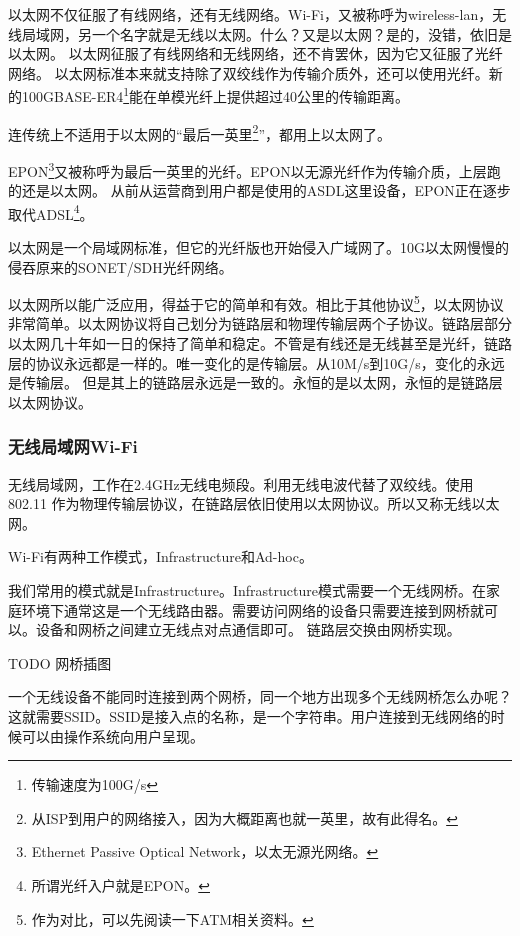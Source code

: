 以太网不仅征服了有线网络，还有无线网络。Wi-Fi，又被称呼为wireless-lan，无线局域网，另一个名字就是无线以太网。什么？又是以太网？是的，没错，依旧是以太网。
以太网征服了有线网络和无线网络，还不肯罢休，因为它又征服了光纤网络。
以太网标准本来就支持除了双绞线作为传输介质外，还可以使用光纤。新的100GBASE-ER4\footnote{传输速度为100G/s}能在单模光纤上提供超过40公里的传输距离。

连传统上不适用于以太网的“最后一英里\footnote{从ISP到用户的网络接入，因为大概距离也就一英里，故有此得名。}”，都用上以太网了。

EPON\footnote{Ethernet Passive Optical Network，以太无源光网络。}又被称呼为最后一英里的光纤。EPON以无源光纤作为传输介质，上层跑的还是以太网。
从前从运营商到用户都是使用的ASDL这里设备，EPON正在逐步取代ADSL\footnote{所谓光纤入户就是EPON。}。%

以太网是一个局域网标准，但它的光纤版也开始侵入广域网了。10G以太网慢慢的侵吞原来的SONET/SDH光纤网络。

以太网所以能广泛应用，得益于它的简单和有效。相比于其他协议\footnote{作为对比，可以先阅读一下ATM相关资料。}，以太网协议非常简单。以太网协议将自己划分为链路层和物理传输层两个子协议。链路层部分以太网几十年如一日的保持了简单和稳定。不管是有线还是无线甚至是光纤，链路层的协议永远都是一样的。唯一变化的是传输层。从10M/s到10G/s，变化的永远是传输层。
但是其上的链路层永远是一致的。永恒的是以太网，永恒的是链路层以太网协议。

\subsubsection{无线局域网Wi-Fi}

无线局域网，工作在2.4GHz无线电频段。利用无线电波代替了双绞线。使用 802.11 作为物理传输层协议，在链路层依旧使用以太网协议。所以又称无线以太网。

Wi-Fi有两种工作模式，Infrastructure和Ad-hoc。

我们常用的模式就是Infrastructure。Infrastructure模式需要一个无线网桥。在家庭环境下通常这是一个无线路由器。需要访问网络的设备只需要连接到网桥就可以。设备和网桥之间建立无线点对点通信即可。
链路层交换由网桥实现。

TODO 网桥插图 %

一个无线设备不能同时连接到两个网桥，同一个地方出现多个无线网桥怎么办呢？这就需要SSID。SSID是接入点的名称，是一个字符串。用户连接到无线网络的时候可以由操作系统向用户呈现。

